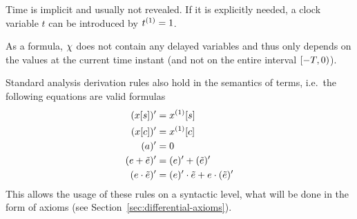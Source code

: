     Time is implicit and usually not revealed. If it is explicitly needed, a clock variable $t$ can be introduced by $\hevolve{\D{t}=1}$.



    As a \FOLR formula, $\chi$ does not contain any delayed variables and thus only depends on the values at the current time instant (and not on the entire interval $[-T,0)$).

    \begin{lemma}[Derivatives]\label{lm:derivatives}
        Standard analysis derivation rules also hold in the semantics of \ddL terms, i.e.\ the following equations are valid \ddL formulas
        \begin{align}
            \der{\x[s]} &= \Dx[s]\\
            \der{\x[c]} &= \Dx[c]\\
            \der{a} &= 0\\
            \der{\astrm+\bstrm} &= \der{\astrm}+\der{\bstrm}\\
            \der{\astrm\cdot\bstrm} &= \der{\astrm}\cdot\bstrm + \astrm\cdot\der{\bstrm}\\
        \end{align}
        This allows the usage of these rules on a syntactic level, what will be done in the form of axioms (see Section~\ref{sec:differential-axioms}).
    \end{lemma}
